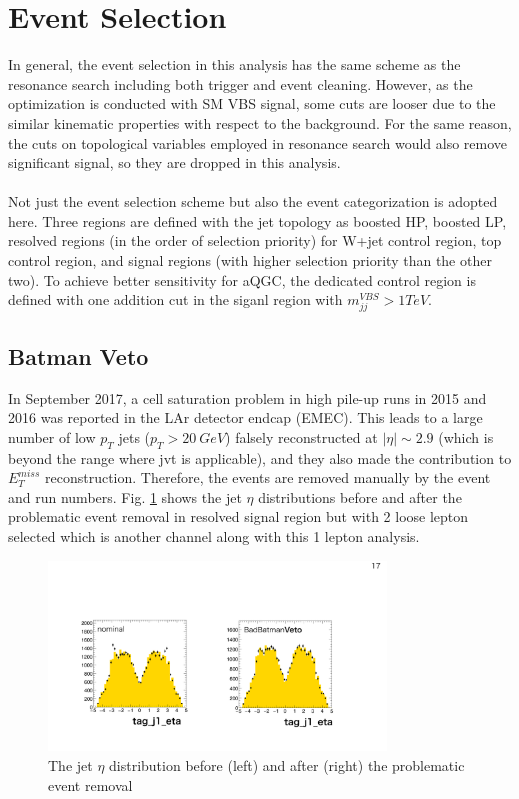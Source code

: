 \section{Event Selection}
In general, the event selection in this analysis has the same scheme as the resonance search including both trigger and event cleaning. However, as the optimization is conducted with SM VBS signal, some cuts are looser due to the similar kinematic properties with respect to the background. For the same reason, the cuts on topological variables employed in resonance search would also remove significant signal, so they are dropped in this analysis.
\\
\\Not just the event selection scheme but also the event categorization is adopted here. Three regions are defined with the jet topology as boosted HP, boosted LP, resolved regions (in the order of selection priority) for W+jet control region, top control region, and signal regions (with higher selection priority than the other two). To achieve better sensitivity for aQGC, the dedicated control region is defined with one addition cut in the siganl region with $m^{VBS}_{jj}>1TeV$. 
\subsection{Batman Veto}
In September 2017, a cell saturation problem in high pile-up runs in 2015 and 2016 was reported in the LAr detector endcap (EMEC). This leads to a large number of low $p_{T}$ jets ($p_{T}>20~GeV$) falsely reconstructed at $|\eta|\sim 2.9$ (which is beyond the range where jvt is applicable), and they also made the contribution to $E^{miss}_{T}$ reconstruction. Therefore, the events are removed manually by the event and run numbers. Fig. \ref{Fig:batman_veto} shows the jet $\eta$ distributions before and after the problematic event removal in resolved signal region but with 2 loose lepton selected which is another channel along with this 1 lepton analysis. 
\begin{figure}[tbp]
	\begin{center}
		\includegraphics[width=0.8\textwidth,keepaspectratio]{Chapter5/SR_EtaTagResJet_BatmanVeto}
		\caption{The jet $\eta$ distribution before (left) and after (right) the problematic event removal}
		\label{Fig:batman_veto}
	\end{center}
\end{figure} 
 
